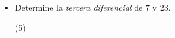 \documentclass[10pt, twocolumn, landscape, a4paper]{article}
\begin{document}
\begin{itemize}
	\item{Determine la \textit{tercera diferencial} de $7$ y $23$.
		\begin{tasks}(5)
		\end{tasks}
	}
	
\end{itemize}
\end{document}
